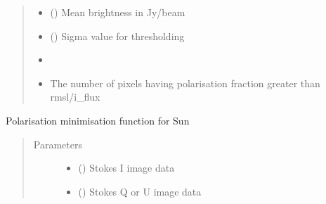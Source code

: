 \documentclass[letterpaper,10pt,english]{sphinxmanual}
\begin{document}
\begin{fulllineitems}
\begin{fulllineitems}
\begin{quote}
\begin{description}
\begin{itemize}
\item {} 
\sphinxAtStartPar
{} () \textendash{} Mean brightness in Jy/beam

\item {} 
\sphinxAtStartPar
{} () \textendash{} Sigma value for thresholding

\item {} 
\sphinxAtStartPar
{} \textendash{} 

\item {} 
\sphinxAtStartPar
{} \textendash{} The number of pixels having polarisation fraction greater than rmsl/i\_flux

\end{itemize}

\end{description}\end{quote}

\end{fulllineitems}


\begin{fulllineitems}
\label{\detokenize{paircars:paircars.fullpol_selfcal_LTS.PolSelfcal.solarlin_pol_minimise}}
\sphinxAtStartPar
Polarisation minimisation function for Sun
\begin{quote}\begin{description}
\item[{Parameters}] \leavevmode\begin{itemize}
\item {} 
\sphinxAtStartPar
{} () \textendash{} Stokes I image data

\item {} 
\sphinxAtStartPar
{} () \textendash{} Stokes Q or U image data


\end{itemize}
\end{description}
\end{quote}
\end{fulllineitems}
\end{fulllineitems}
\end{document}
